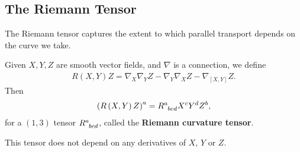 
\subsection{The Riemann Tensor}

The Riemann tensor captures the extent to which parallel transport depends on the curve we take.

\begin{definition}
    Given $X,Y,Z$ are smooth vector fields, and $\nabla$ is a connection, we define
    \begin{align}
        R \left( X,Y \right) Z = \nabla_X \nabla_Y Z - \nabla_Y \nabla_X Z - \nabla_{\left[ X, Y \right] } Z
    .\end{align}
    Then
    \begin{align}
        \left( R \left( X,Y \right) Z \right)^{a} = \tensor{R}{^{a}_{bcd}} X^{c} Y^{d} Z^{b}
    ,\end{align}
    for a $\left( 1,3 \right) $ tensor $\tensor{R}{^{a}_{bcd}}$, called the \textbf{Riemann curvature tensor}.
\end{definition}

\begin{note}
    This tensor does not depend on any derivatives of $X$, $Y$ or $Z$.
\end{note}

